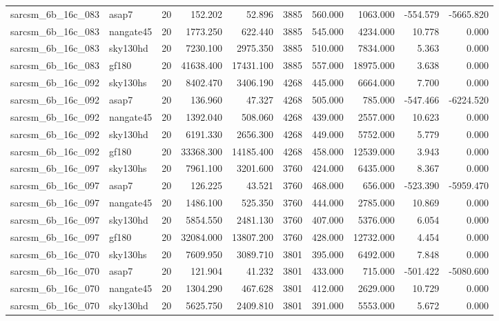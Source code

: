 \documentclass{article}
\begin{document}
\begin{longtable}{llrrrrrrrr}
sarcsm\_6b\_16c\_083 & asap7 & 20 & 152.202 & 52.896 & 3885 & 560.000 & 1063.000 & -554.579 & -5665.820 \\
sarcsm\_6b\_16c\_083 & nangate45 & 20 & 1773.250 & 622.440 & 3885 & 545.000 & 4234.000 & 10.778 & 0.000 \\
sarcsm\_6b\_16c\_083 & sky130hd & 20 & 7230.100 & 2975.350 & 3885 & 510.000 & 7834.000 & 5.363 & 0.000 \\
sarcsm\_6b\_16c\_083 & gf180 & 20 & 41638.400 & 17431.100 & 3885 & 557.000 & 18975.000 & 3.638 & 0.000 \\
sarcsm\_6b\_16c\_092 & sky130hs & 20 & 8402.470 & 3406.190 & 4268 & 445.000 & 6664.000 & 7.700 & 0.000 \\
sarcsm\_6b\_16c\_092 & asap7 & 20 & 136.960 & 47.327 & 4268 & 505.000 & 785.000 & -547.466 & -6224.520 \\
sarcsm\_6b\_16c\_092 & nangate45 & 20 & 1392.040 & 508.060 & 4268 & 439.000 & 2557.000 & 10.623 & 0.000 \\
sarcsm\_6b\_16c\_092 & sky130hd & 20 & 6191.330 & 2656.300 & 4268 & 449.000 & 5752.000 & 5.779 & 0.000 \\
sarcsm\_6b\_16c\_092 & gf180 & 20 & 33368.300 & 14185.400 & 4268 & 458.000 & 12539.000 & 3.943 & 0.000 \\
sarcsm\_6b\_16c\_097 & sky130hs & 20 & 7961.100 & 3201.600 & 3760 & 424.000 & 6435.000 & 8.367 & 0.000 \\
sarcsm\_6b\_16c\_097 & asap7 & 20 & 126.225 & 43.521 & 3760 & 468.000 & 656.000 & -523.390 & -5959.470 \\
sarcsm\_6b\_16c\_097 & nangate45 & 20 & 1486.100 & 525.350 & 3760 & 444.000 & 2785.000 & 10.869 & 0.000 \\
sarcsm\_6b\_16c\_097 & sky130hd & 20 & 5854.550 & 2481.130 & 3760 & 407.000 & 5376.000 & 6.054 & 0.000 \\
sarcsm\_6b\_16c\_097 & gf180 & 20 & 32084.000 & 13807.200 & 3760 & 428.000 & 12732.000 & 4.454 & 0.000 \\
sarcsm\_6b\_16c\_070 & sky130hs & 20 & 7609.950 & 3089.710 & 3801 & 395.000 & 6492.000 & 7.848 & 0.000 \\
sarcsm\_6b\_16c\_070 & asap7 & 20 & 121.904 & 41.232 & 3801 & 433.000 & 715.000 & -501.422 & -5080.600 \\
sarcsm\_6b\_16c\_070 & nangate45 & 20 & 1304.290 & 467.628 & 3801 & 412.000 & 2629.000 & 10.729 & 0.000 \\
sarcsm\_6b\_16c\_070 & sky130hd & 20 & 5625.750 & 2409.810 & 3801 & 391.000 & 5553.000 & 5.672 & 0.000 \\

\end{longtable}
\end{document}
